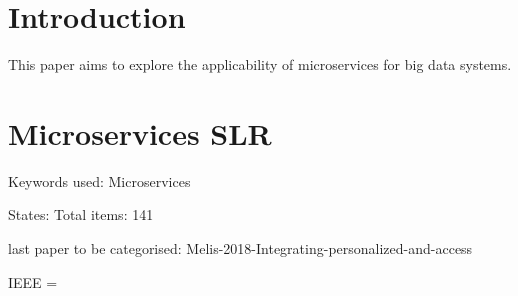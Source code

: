 \documentclass[conference]{IEEEtran}
\begin{document}
\title{}

\author{
    \and
}

\maketitle


\begin{abstract}
 
\end{abstract}


\begin{IEEEkeywords}

\end{IEEEkeywords}

\section{Introduction}

This paper aims to explore the applicability of microservices for big data systems.


\section{Microservices SLR}

Keywords used: 
Microservices

States:
Total items: 141

last paper to be categorised: 
Melis-2018-Integrating-personalized-and-access

IEEE = 


% 
% 
\end{document}
